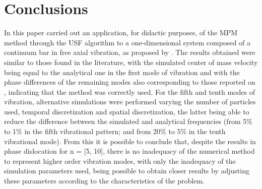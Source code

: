 \documentclass[preprint,12pt]{elsarticle}
\begin{document}
\section{Conclusions}
In this paper carried out an application, for didactic purposes, of the MPM method through the USF algorithm to a one-dimensional system composed of a continuum bar in free axial vibration, as proposed by \cite{Bardenhagen2002}. The results obtained were similar to those found in the literature, with the simulated center of mass velocity being equal to the analytical one in the first mode of vibration and with the phase differences of the remaining modes also corresponding to those reported on \cite{Bardenhagen2002}, indicating that the method was correctly used. For the fifth and tenth modes of vibration, alternative simulations were performed varying the number of particles used, temporal discretization and spatial discretization, the latter being able to reduce the difference between the simulated and analytical frequencies (from 5\% to 1\% in the fifth vibrational pattern; and from 20\% to 5\% in the tenth vibrational mode). From this it is possible to conclude that, despite the results in phase dislocation for n = [5, 10], there is no inadequacy of the numerical method to represent higher order vibration modes, with only the inadequacy of the simulation parameters used, being possible to obtain closer results by adjusting these parameters according to the characteristics of the problem.
  
 





\end{document}
